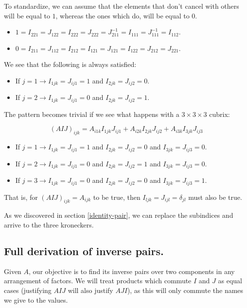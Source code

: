To standardize, we can assume that the elements that don't cancel with others will be equal to $1$, whereas the ones which do, will be equal to $0$.

\begin{itemize}
	\item $1 = I_{221} = J_{122} = I_{222} = J_{222} = J_{211}^{-1} = I_{111} = J_{111}^{-1} = I_{112}$.
	\item $0 = I_{211} = J_{112} = I_{212} = I_{121} = J_{121} = I_{122} = J_{212} = J_{221}$.
\end{itemize}

We see that the following is always satisfied:

\begin{itemize}
	\item If $j = 1 \rightarrow I_{1jk} = J_{ij1} = 1$ and $I_{2jk} = J_{ij2} = 0$.
	\item If $j = 2 \rightarrow I_{1jk} = J_{ij1} = 0$ and $I_{2jk} = J_{ij2} = 1$.
\end{itemize}

The pattern becomes trivial if we see what happens with a $3 \times 3 \times 3$ cubrix:

$$(AIJ)_{ijk} = A_{i1k} I_{1jk} J_{ij1} + A_{i2k} I_{2jk} J_{ij2} + A_{i3k} I_{3jk} J_{ij3}$$

\begin{itemize}
	\item If $j = 1 \rightarrow I_{1jk} = J_{ij1} = 1$ and $I_{2jk} = J_{ij2} = 0$ and $I_{3jk} = J_{ij3} = 0$.
	\item If $j = 2 \rightarrow I_{1jk} = J_{ij1} = 0$ and $I_{2jk} = J_{ij2} = 1$ and $I_{3jk} = J_{ij3} = 0$.
	\item If $j = 3 \rightarrow I_{1jk} = J_{ij1} = 0$ and $I_{2jk} = J_{ij2} = 0$ and $I_{3jk} = J_{ij3} = 1$.
\end{itemize}

That is, for $(AIJ)_{ijk} = A_{ijk}$ to be true, then $I_{ljk} = J_{ijl} = \delta_{jl}$ must also be true.

As we discovered in section \ref{identity-pair}, we can replace the subindices and arrive to the three kroneckers.

\subsection{Full derivation of inverse pairs.} \label{appendix-3}

Given $A$, our objective is to find its inverse pairs over two components in any arrangement of factors. We will treat products which commute $I$ and $J$ as equal cases (justifying $AIJ$ will also justify $AJI$), as this will only commute the names we give to the values.

